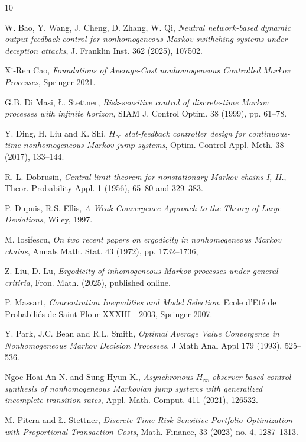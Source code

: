 \documentclass[10pt,english]{extarticle}
\begin{document}

\begin{thebibliography}{10}

{\sc W. Bao, Y. Wang, J. Cheng, D. Zhang, W. Qi}, {\em Neutral network-based dynamic output feedback control for nonhomogeneous Markov swithching systems under deception attacks}, J. Franklin Inst. 362 (2025), 107502. 

{\sc Xi-Ren Cao}, {\em Foundations of Average-Cost nonhomogeneous Controlled Markov Processes},
Springer 2021.

{\sc G.B. Di Masi, {\L}. Stettner}, {\em Risk-sensitive control of discrete-time {M}arkov processes with infinite horizon}, SIAM J. Control Optim.  38 (1999), pp. 61--78.
	
 {\sc Y. Ding, H. Liu and K. Shi}, {\em $H_\infty$ stat-feedback controller design for continuous-time nonhomogeneous Markov jump systems}, Optim. Control Appl. Meth. 38 (2017), 133--144.

{\sc R. L. Dobrusin}, {\em Central limit theorem for nonstationary Markov chains I, II.},
Theor. Probability Appl. 1 (1956), 65--80 and 329--383.

{\sc P. Dupuis, R.S. Ellis}, {\em A Weak Convergence Approach to the Theory of Large Deviations}, Wiley, 1997.	

{\sc M. Iosifescu}, {\em On two recent papers on ergodicity in nonhomogeneous Markov chains}, Annals Math. Stat. 43 (1972), pp. 1732--1736, 

{\sc Z. Liu, D. Lu}, {\em Ergodicity of inhomogeneous Markov processes under general critiria},
Fron. Math. (2025), published online. 


 {\sc  P. Massart}, {\em Concentration Inequalities and Model Selection}, Ecole d'Et\'e de Probabili\'es de Saint-Flour XXXIII - 2003, Springer 2007.

 {\sc Y. Park, J.C. Bean and R.L. Smith}, {\em Optimal Average Value Convergence in Nonhomogeneous Markov Decision Processes}, J Math Anal Appl 179 (1993), 525--536. 

{\sc Ngoc Hoai An N. and Sung Hyun K.}, {\em Asynchronous $H_\infty$ observer-based control synthesis of nonhomogeneous Markovian jump systems with generalized incomplete transition rates}, Appl. Math. Comput. 411 (2021), 126532.

{\sc M. Pitera and {\L}. Stettner}, {\em Discrete-Time Risk Sensitive Portfolio Optimization with Proportional Transaction Costs}, Math. Finance, 33 (2023) no. 4, 1287--1313.



\end{thebibliography}
\end{document}
